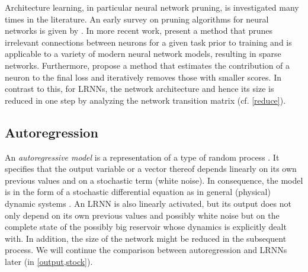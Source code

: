 \documentclass[twoside,11pt]{article}
\theoremstyle{definition}
\begin{document}
Architecture learning, in particular neural network pruning, is
investigated many times in the literature. An early survey on pruning algorithms
for neural networks is given by \citet{Ree93}. In more recent work,
\citet{LAT19} present a method that prunes irrelevant connections between
neurons for a given task prior to training and is applicable to a variety of
modern neural network models, resulting in sparse networks. Furthermore,
\citet{MM+19} propose a method that estimates the contribution of a neuron to
the final loss and iteratively removes those with smaller scores. In contrast to
this, for LRNNs, the network architecture and hence its size is reduced in one
step by analyzing the network transition matrix (cf. \cref{reduce}).

\subsection{Autoregression}\label{regress}


An \emph{autoregressive model} is a representation of a type of random process
\citep{Aka69}. It specifies that the output variable or a vector thereof depends
linearly on its own previous values and on a stochastic term (white noise). In
consequence, the model is in the form of a stochastic differential equation as in
general (physical) dynamic systems \citep{CK14}. An LRNN is also linearly
activated, but its output does not only depend on its own previous values and
possibly white noise but on the complete state of the possibly big reservoir
whose dynamics is explicitly dealt with. In addition, the size of the network
might be reduced in the subsequent process. We will continue the comparison
between autoregression and LRNNs later (in \cref{output,stock}).
\end{document}
